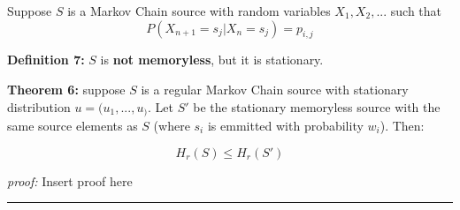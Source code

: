 \documentclass{article}
\begin{document}
Suppose $S$ is a Markov Chain source with random variables $X_1, X_2, ...$ such that
$$
P(X_{n + 1} = s_j | X_{n} = s_j ) = p_{i, j}
$$

\noindent \textbf{Definition 	7:} $S$ is \textbf{not memoryless}, but it is stationary.

 \noindent \textbf{Theorem  6:} suppose $S$ is a regular Markov Chain source with stationary distribution $u = (u_1, ..., u_)$. Let $S'$ be the stationary memoryless source with the same source elements as $S$ (where $s_i$ is emmitted with probability $w_i$). Then:
 
 $$
 H_{r} (S) \leq H_{r} (S')
 $$
 
 \noindent\textit{proof:}  Insert proof here

\noindent
{\color{gray} \rule{\linewidth}{0.5mm} }
\end{document}
